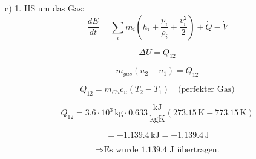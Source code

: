 c) 1. HS um das Gas:
\begin{equation}
\frac{dE}{dt} = \sum_i \dot{m}_i (h_i + \frac{p_i}{\rho_i} + \frac{v_i^2}{2}) + \dot{Q} - \dot{V}
\end{equation}

\begin{equation}
\Delta U = Q_{12}
\end{equation}

\begin{equation}
m_{gas} (u_2 - u_1) = Q_{12}
\end{equation}

\begin{equation}
Q_{12} = m_{Cu} c_{u} (T_2 - T_1) \quad \text{(perfekter Gas)}
\end{equation}

\begin{equation}
Q_{12} = 3.6 \cdot 10^3 \, \text{kg} \cdot 0.633 \, \frac{\text{kJ}}{\text{kgK}} (273.15 \, \text{K} - 773.15 \, \text{K})
\end{equation}

\begin{equation}
= -1.139.4 \, \text{kJ} = -1.139.4 \, \text{J}
\end{equation}

\begin{equation}
\Rightarrow \text{Es wurde 1.139.4 J übertragen.}
\end{equation}